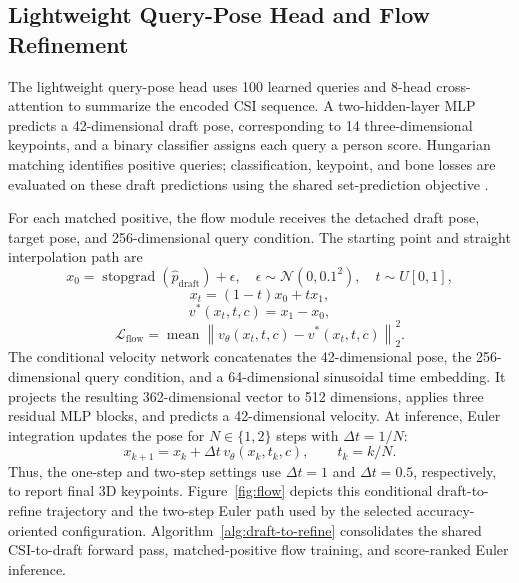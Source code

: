 \documentclass[conference,onecolumn]{IEEEtran}
\begin{document}
\subsection{Lightweight Query-Pose Head and Flow Refinement}
The lightweight query-pose head uses 100 learned queries and 8-head cross-attention to summarize the encoded CSI sequence. A two-hidden-layer MLP predicts a 42-dimensional draft pose, corresponding to 14 three-dimensional keypoints, and a binary classifier assigns each query a person score. Hungarian matching identifies positive queries; classification, keypoint, and bone losses are evaluated on these draft predictions using the shared set-prediction objective \cite{yan2024personwifi3d,shi2022petr}.

For each matched positive, the flow module receives the detached draft pose, target pose, and 256-dimensional query condition. The starting point and straight interpolation path are
\begin{equation}
x_0=\operatorname{stopgrad}(\hat p_{\mathrm{draft}})+\epsilon,\quad
\epsilon\sim\mathcal{N}(0,0.1^2),\quad t\sim U[0,1],
\label{eq:flow-start}
\end{equation}
\begin{equation}
x_t = (1-t)x_0 + t x_1,
\label{eq:flow-path}
\end{equation}
\begin{equation}
v^*(x_t,t,c)=x_1-x_0,
\label{eq:flow-target}
\end{equation}
\begin{equation}
\mathcal{L}_{\mathrm{flow}}=\operatorname{mean}\left\|v_\theta(x_t,t,c)-v^*(x_t,t,c)\right\|_2^2.
\label{eq:flow-loss}
\end{equation}
The conditional velocity network concatenates the 42-dimensional pose, the 256-dimensional query condition, and a 64-dimensional sinusoidal time embedding. It projects the resulting 362-dimensional vector to 512 dimensions, applies three residual MLP blocks, and predicts a 42-dimensional velocity. At inference, Euler integration updates the pose for $N\in\{1,2\}$ steps with $\Delta t=1/N$:
\begin{equation}
x_{k+1}=x_k+\Delta t\,v_\theta(x_k,t_k,c),\qquad t_k=k/N.
\label{eq:euler}
\end{equation}
Thus, the one-step and two-step settings use $\Delta t=1$ and $\Delta t=0.5$, respectively, to report final 3D keypoints. Figure~\ref{fig:flow} depicts this conditional draft-to-refine trajectory and the two-step Euler path used by the selected accuracy-oriented configuration. Algorithm~\ref{alg:draft-to-refine} consolidates the shared CSI-to-draft forward pass, matched-positive flow training, and score-ranked Euler inference.
\end{document}
